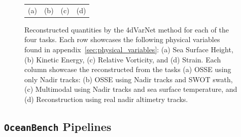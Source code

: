 \begin{figure}[h]
\begin{center}
{\begin{tabular}{cccc}
(a) & (b) & (c) & (d)
\end{tabular}}
\vspace{-3mm}
\caption{
Reconstructed quantities by the 4dVarNet method for each of the four tasks.
Each row showcases the following physical variables found in appendix~\ref{sec:physical_variables}: (a) Sea Surface Height, (b) Kinetic Energy, (c) Relative Vorticity, and (d) Strain. 
Each column showcase the reconstructed from the tasks (a) OSSE using only Nadir tracks: (b) OSSE using Nadir tracks and SWOT swath, (c) Multimodal using Nadir tracks and sea surface temperature, and (d) Reconstruction using real nadir altimetry tracks.}
\label{fig:oceanbench_maps_4dvarnet}
\vspace{-5mm}
\end{center}
\end{figure}



\subsection*{\texttt{OceanBench} Pipelines}

